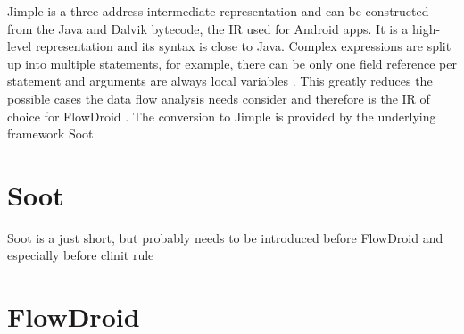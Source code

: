 \documentclass[../draft.tex]{subfiles}
\begin{document}
    Jimple is a three-address intermediate representation and can be constructed from the Java and Dalvik bytecode, the IR used for Android apps. It is a high-level representation and its syntax is close to Java. Complex expressions are split up into multiple statements, for example, there can be only one field reference per statement and arguments are always local variables \cite{Valleerai2004}. This greatly reduces the possible cases the data flow analysis needs consider and therefore is the IR of choice for FlowDroid \cite{Arzt2017PhD}. 
    The conversion to Jimple is provided by the underlying framework Soot. 

    \section{Soot}
    Soot is a 
    just short, but probably needs to be introduced before FlowDroid and especially before clinit rule
    \section{FlowDroid}    
\end{document}
